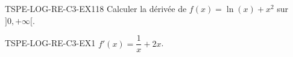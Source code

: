 

\begin{exercice}{TSPE-LOG-RE-C3-EX1}{1}{8}
Calculer la dérivée de $f(x) = \ln(x) + x^2$ sur $]0,+\infty[$.
\end{exercice}


\begin{corrige}{TSPE-LOG-RE-C3-EX1}
$f'(x) = \dfrac{1}{x} + 2x$.
\end{corrige}
